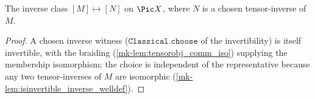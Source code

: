 \begin{definition}\label{mk-def:pic_inv}
  \leanok

  The inverse class \([M] \mapsto [N]\) on \(\Pic X\), where \(N\) is a chosen tensor-inverse
  of \(M\).
\end{definition}
\begin{proof}
  \leanok
A chosen inverse witness
  (\(\mathtt{Classical.choose}\) of the invertibility) is itself invertible, with the
  braiding (\ref{mk-lem:tensorobj_comm_iso}) supplying the membership isomorphism; the choice
  is independent of the representative because any two tensor-inverses of \(M\) are
  isomorphic (\ref{mk-lem:isinvertible_inverse_welldef}).
\end{proof}
